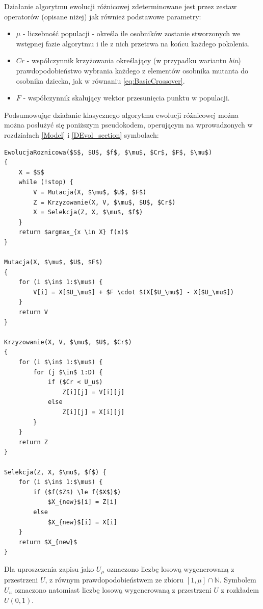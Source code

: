 \documentclass[12pt,a4paper]{report}
\begin{document}
{{\par{
Działanie algorytmu ewolucji różnicowej zdeterminowane jest przez zestaw operatorów (opisane niżej) jak również podstawowe parametry:
\begin{itemize}
\item $\mu$ - liczebność populacji - określa ile osobników zostanie stworzonych we wstępnej fazie algorytmu i ile z nich przetrwa na końcu każdego pokolenia.
\item $Cr$ - współczynnik krzyżowania określający (w przypadku wariantu \emph{bin}) prawdopodobieństwo wybrania każdego z elementów osobnika mutanta do osobnika dziecka, jak w równaniu \ref{eq:BasicCrossover}.
\item $F$ - współczynnik skalujący wektor przesunięcia punktu w populacji.
\end{itemize}
}

\par{
Podsumowując działanie klasycznego algorytmu ewolucji różnicowej można można posłużyć się poniższym pseudokodem, operującym na wprowadzonych w rozdziałach \ref{Model} i \ref{DEvol_section} symbolach:
\lstset{language=C}
\begin{lstlisting}[frame=single,mathescape]
EwolucjaRoznicowa($S$, $U$, $f$, $\mu$, $Cr$, $F$, $\mu$)
{
    X = $S$
    while (!stop) {
        V = Mutacja(X, $\mu$, $U$, $F$)
        Z = Krzyzowanie(X, V, $\mu$, $U$, $Cr$)
        X = Selekcja(Z, X, $\mu$, $f$)
    }
    return $argmax_{x \in X} f(x)$
}

Mutacja(X, $\mu$, $U$, $F$)
{
    for (i $\in$ 1:$\mu$) {
        V[i] = X[$U_\mu$] + $F \cdot $(X[$U_\mu$] - X[$U_\mu$])
    }
    return V
}

Krzyzowanie(X, V, $\mu$, $U$, $Cr$)
{
    for (i $\in$ 1:$\mu$) {
        for (j $\in$ 1:D) {
            if ($Cr < U_u$)
                Z[i][j] = V[i][j]
            else
                Z[i][j] = X[i][j]
        }
    }
    return Z
}

Selekcja(Z, X, $\mu$, $f$) {
    for (i $\in$ 1:$\mu$) {
        if ($f($Z$) \le f($X$)$)
            $X_{new}$[i] = Z[i]
        else
            $X_{new}$[i] = X[i]
    }
    return $X_{new}$
}
\end{lstlisting}

Dla uproszczenia zapisu jako $U_\mu$ oznaczono liczbę losową wygenerowaną z przestrzeni $U$, z równym prawdopodobieństwem ze zbioru $[1, \mu] \cap \mathbb{N}$. Symbolem $U_u$ oznaczono natomiast liczbę losową wygenerowaną z przestrzeni $U$ z rozkładem $U(0,1)$.
}

}}
\end{document}
